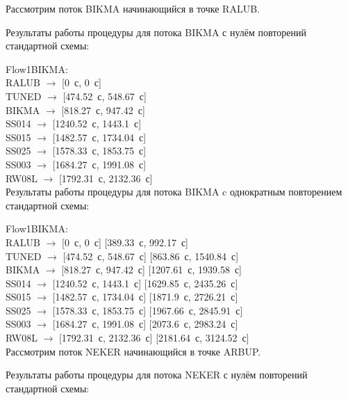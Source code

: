 \documentclass[12pt]{article}
\theoremstyle{plain}
\begin{document}
Рассмотрим поток BIKMA начинающийся в точке RALUB.

Результаты работы процедуры для потока BIKMA с нулём повторений стандартной схемы:

\noindent Flow1BIKMA:\\
RALUB $\rightarrow$ [0~с, 0~с]\\
TUNED $\rightarrow$ [474.52~с, 548.67~с]\\
BIKMA $\rightarrow$ [818.27~с, 947.42~с]\\
SS014 $\rightarrow$ [1240.52~с, 1443.1~с]\\
SS015 $\rightarrow$ [1482.57~с, 1734.04~с]\\
SS025 $\rightarrow$ [1578.33~с, 1853.75~с]\\
SS003 $\rightarrow$ [1684.27~с, 1991.08~с]\\
RW08L $\rightarrow$ [1792.31~с, 2132.36~с]\\


Результаты работы процедуры для потока BIKMA c однократным повторением стандартной схемы:

\noindent Flow1BIKMA:\\
RALUB $\rightarrow$ [0~с, 0~с] [389.33~с, 992.17~с]\\
TUNED $\rightarrow$ [474.52~с, 548.67~с] [863.86~с, 1540.84~с]\\
BIKMA $\rightarrow$ [818.27~с, 947.42~с] [1207.61~с, 1939.58~с]\\
SS014 $\rightarrow$ [1240.52~с, 1443.1~с] [1629.85~с, 2435.26~с]\\
SS015 $\rightarrow$ [1482.57~с, 1734.04~с] [1871.9~с, 2726.21~с]\\
SS025 $\rightarrow$ [1578.33~с, 1853.75~с] [1967.66~с, 2845.91~с]\\
SS003 $\rightarrow$ [1684.27~с, 1991.08~с] [2073.6~с, 2983.24~с]\\
RW08L $\rightarrow$ [1792.31~с, 2132.36~с] [2181.64~с, 3124.52~с]\\


Рассмотрим поток NEKER начинающийся в точке ARBUP.

Результаты работы процедуры для потока NEKER с нулём повторений стандартной схемы:
\end{document}
